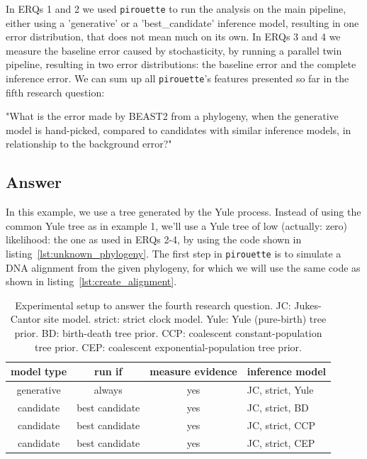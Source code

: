 \documentclass{article}
\begin{document}
In ERQs 1 and 2 we used \verb;pirouette; to  
run the analysis on the main pipeline, either using a 'generative' or a 
'best\_candidate' inference model, resulting in one error distribution,
that does not mean much on its own.
In ERQs 3 and 4 we measure the baseline error caused by stochasticity,
by running a parallel twin pipeline, resulting in two error distributions:
the baseline error and the complete inference error.
We can sum up all \verb;pirouette;'s features presented so far in the fifth 
research question:

"What is the error made by BEAST2 from a phylogeny, 
when the generative model is hand-picked, 
compared to candidates with similar inference models, 
in relationship to the background error?"

\subsection{Answer}

In this example, we use a tree generated by the Yule process.
Instead of using the common Yule tree as in example 1, we'll use
a Yule tree of low (actually: zero) likelihood: 
the one as used in ERQs 2-4, by using the code shown 
in listing~\ref{lst:unknown_phylogeny}.
The first step in \verb;pirouette; is to simulate a DNA alignment 
from the given phylogeny, for which we will use the same code 
as shown in listing~\ref{lst:create_alignment}.

\begin{table}
  \begin{tabular}{ | c | c | c | l | }
    \hline
    \textbf{model type} & \textbf{run if} & \textbf{measure evidence} & 
\textbf{inference model} \\ 
    \hline
    generative & always         & yes & JC, strict, Yule \\
    candidate  & best candidate & yes & JC, strict, BD \\
    candidate  & best candidate & yes & JC, strict, CCP \\
    candidate  & best candidate & yes & JC, strict, CEP \\
    \hline
  \end{tabular}
  \caption{
    Experimental setup to answer the fourth research question.
    JC: Jukes-Cantor site model.
    strict: strict clock model.
    Yule: Yule (pure-birth) tree prior.
    BD: birth-death tree prior.
    CCP: coalescent constant-population tree prior.
    CEP: coalescent exponential-population tree prior.
  }
  \label{tab:experiment_5}
\end{table}
\end{document}
